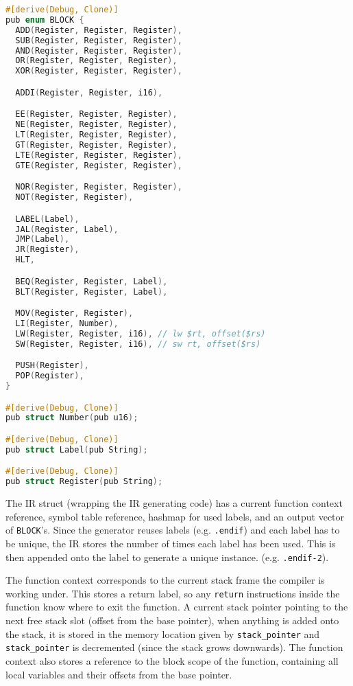 \begin{lstlisting}[language=C]
#[derive(Debug, Clone)]
pub enum BLOCK {
  ADD(Register, Register, Register),
  SUB(Register, Register, Register),
  AND(Register, Register, Register),
  OR(Register, Register, Register),
  XOR(Register, Register, Register),

  ADDI(Register, Register, i16),

  EE(Register, Register, Register),
  NE(Register, Register, Register),
  LT(Register, Register, Register),
  GT(Register, Register, Register),
  LTE(Register, Register, Register),
  GTE(Register, Register, Register),

  NOR(Register, Register, Register),
  NOT(Register, Register),

  LABEL(Label),
  JAL(Register, Label),
  JMP(Label),
  JR(Register),
  HLT,

  BEQ(Register, Register, Label),
  BLT(Register, Register, Label),

  MOV(Register, Register),
  LI(Register, Number),
  LW(Register, Register, i16), // lw $rt, offset($rs)
  SW(Register, Register, i16), // sw rt, offset($rs)

  PUSH(Register),
  POP(Register),
}

#[derive(Debug, Clone)]
pub struct Number(pub u16);

#[derive(Debug, Clone)]
pub struct Label(pub String);

#[derive(Debug, Clone)]
pub struct Register(pub String); 
\end{lstlisting}

The IR struct (wrapping the IR generating code) has a current function context reference, symbol table reference, hashmap for used labels, and an output vector of \texttt{BLOCK}'s. Since the generator reuses labels (e.g. \texttt{.endif}) and each label has to be unique, the IR stores the number of times each label has been used. This is then appended onto the label to generate a unique instance. (e.g. \texttt{.endif-2}). 

The function context corresponds to the current stack frame the compiler is working under. This stores a return label, so any \texttt{return} instructions inside the function know where to exit the function. A current stack pointer pointing to the next free stack slot (offset from the base pointer), when anything is added onto the stack, it is stored in the memory location given by \texttt{stack\_pointer} and \texttt{stack\_pointer} is decremented (since the stack grows downwards). The function context also stores a reference to the block scope of the function, containing all local variables and their offsets from the base pointer. 

